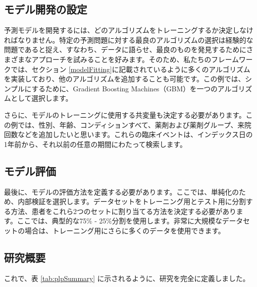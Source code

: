 \documentclass[
  11pt]{book}
\theoremstyle{definition}
\theoremstyle{definition}
\theoremstyle{definition}
\theoremstyle{definition}
\theoremstyle{remark}
\begin{document}
\subsection{モデル開発の設定}\label{ux30e2ux30c7ux30ebux958bux767aux306eux8a2dux5b9a}

予測モデルを開発するには、どのアルゴリズムをトレーニングするか決定しなければなりません。特定の予測問題に対する最良のアルゴリズムの選択は経験的な問題であると捉え、すなわち、データに語らせ、最良のものを発見するためにさまざまなアプローチを試みることを好みます。そのため、私たちのフレームワークでは、セクション \ref{modelFitting}に記載されているように多くのアルゴリズムを実装しており、他のアルゴリズムを追加することも可能です。この例では、シンプルにするために、Gradient Boosting Machines（GBM）を一つのアルゴリズムとして選択します。

さらに、モデルのトレーニングに使用する共変量も決定する必要があります。この例では、性別、年齢、コンディションすべて、薬剤および薬剤グループ、来院回数などを追加したいと思います。これらの臨床イベントは、インデックス日の1年前から、それ以前の任意の期間にわたって検索します。

\subsection{モデル評価}\label{ux30e2ux30c7ux30ebux8a55ux4fa1}

最後に、モデルの評価方法を定義する必要があります。ここでは、単純化のため、内部検証を選択します。データセットをトレーニング用とテスト用に分割する方法、患者をこれら2つのセットに割り当てる方法を決定する必要があります。ここでは、典型的な75\% - 25\%分割を使用します。非常に大規模なデータセットの場合は、トレーニング用にさらに多くのデータを使用できます。

\subsection{研究概要}\label{ux7814ux7a76ux6982ux8981}

これで、表 \ref{tab:plpSummary} に示されるように、研究を完全に定義しました。
\end{document}
